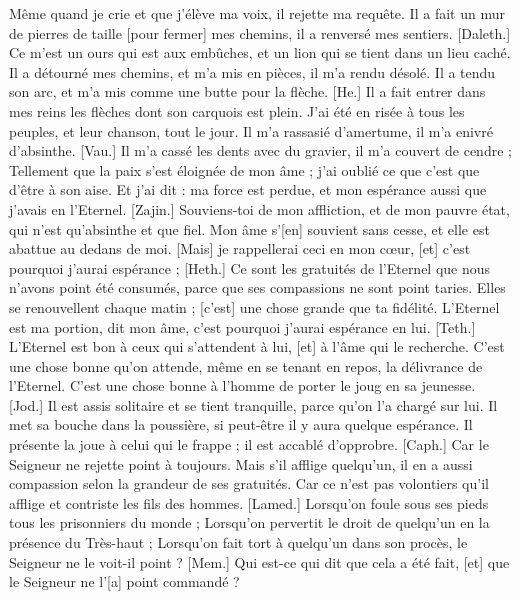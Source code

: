 \begin{multicols}{2}
Même quand je crie et que j’élève ma voix, il rejette ma requête.
Il a fait un mur de pierres de taille [pour fermer] mes chemins, il a renversé mes sentiers.
[Daleth.] Ce m’est un ours qui est aux embûches, et un lion qui se tient dans un lieu caché.
Il a détourné mes chemins, et m’a mis en pièces, il m’a rendu désolé.
Il a tendu son arc, et m’a mis comme une butte pour la flèche.
[He.] Il a fait entrer dans mes reins les flèches dont son carquois est plein.
J’ai été en risée à tous les peuples, et leur chanson, tout le jour.
Il m’a rassasié d’amertume, il m’a enivré d’absinthe.
[Vau.] Il m’a cassé les dents avec du gravier, il m’a couvert de cendre ;
Tellement que la paix s’est éloignée de mon âme ; j’ai oublié ce que c’est que d’être à son aise.
Et j’ai dit : ma force est perdue, et mon espérance aussi que j’avais en l’Eternel.
[Zajin.] Souviens-toi de mon affliction, et de mon pauvre état, qui n’est qu’absinthe et que fiel.
Mon âme s’[en] souvient sans cesse, et elle est abattue au dedans de moi.
[Mais] je rappellerai ceci en mon cœur, [et] c’est pourquoi j’aurai espérance ;
[Heth.] Ce sont les gratuités de l’Eternel que nous n’avons point été consumés, parce que ses compassions ne sont point taries.
Elles se renouvellent chaque matin ; [c’est] une chose grande que ta fidélité.
L’Eternel est ma portion, dit mon âme, c’est pourquoi j’aurai espérance en lui.
[Teth.] L’Eternel est bon à ceux qui s’attendent à lui, [et] à l’âme qui le recherche.
C’est une chose bonne qu’on attende, même en se tenant en repos, la délivrance de l’Eternel.
C’est une chose bonne à l’homme de porter le joug en sa jeunesse.
[Jod.] Il est assis solitaire et se tient tranquille, parce qu’on l’a chargé sur lui.
Il met sa bouche dans la poussière, si peut-être il y aura quelque espérance.
Il présente la joue à celui qui le frappe ; il est accablé d’opprobre.
[Caph.] Car le Seigneur ne rejette point à toujours.
Mais s’il afflige quelqu’un, il en a aussi compassion selon la grandeur de ses gratuités.
Car ce n’est pas volontiers qu’il afflige et contriste les fils des hommes.
[Lamed.] Lorsqu’on foule sous ses pieds tous les prisonniers du monde ;
Lorsqu’on pervertit le droit de quelqu’un en la présence du Très-haut ;
Lorsqu’on fait tort à quelqu’un dans son procès, le Seigneur ne le voit-il point ?
[Mem.] Qui est-ce qui dit que cela a été fait, [et] que le Seigneur ne l’[a] point commandé ?

\end{multicols}
